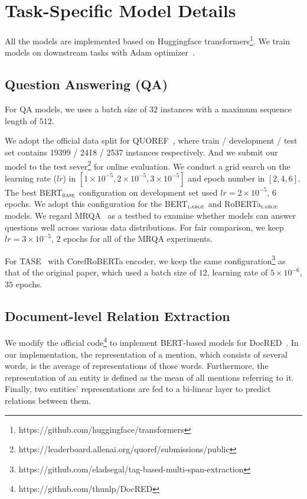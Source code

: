 \documentclass[11pt,a4paper]{article}
\newcommand\BASESIZE{$_{\small \textsc{base}}$\xspace}
\newcommand\LARGESIZE{$_{\small \textsc{large}}$\xspace}
\begin{document}
\section{Task-Specific Model Details}


All the models are implemented based on Huggingface transformers\footnote{https://github.com/huggingface/transformers}. We train models on downstream tasks with Adam optimizer~\citep{Adam}. 


\subsection{Question Answering (QA)}

For QA models, we uses a batch size of $32$ instances with a maximum sequence length of $512$. 

We adopt the official data split for QUOREF~\citep{QUOREF}, where train / development / test set contains 19399 / 2418 / 2537 instances respectively. And we submit our model to the test sever\footnote{https://leaderboard.allenai.org/quoref/submissions/public} for online evaluation.  We conduct a grid search on the learning rate ($lr$) in  $[1\times10^{-5}, 2\times10^{-5}, 3\times10^{-5}]$ and epoch number in $[2, 4, 6]$. The best BERT\BASESIZE configuration on development set used $lr=2\times10^{-5}$, $6$ epochs.  We adopt this configuration for the BERT\LARGESIZE and RoBERTa\LARGESIZE models. 
We regard MRQA~\citep{MRQA} as a testbed to examine whether models can answer questions well across various data distributions. For fair comparison, we keep $lr=3\times10^{-5}$, $2$ epochs for all of the MRQA experiments.

For TASE~\citep{TASE} with CorefRoBERTa encoder, we keep the same configuration\footnote{https://github.com/eladsegal/tag-based-multi-span-extraction} as that of the original paper, which used a batch size of $12$, learning rate of $5\times10^{-6}$, $35$ epochs. 



\subsection{Document-level Relation Extraction}

We modify the official code\footnote{https://github.com/thunlp/DocRED} to implement BERT-based models for DocRED~\citep{DocRED}. In our implementation, the representation of a mention, which consists of several words, is the average of  representations of those words. Furthermore, the representation of an entity is defined as the mean of all  mentions referring to it. Finally, two entities' representations are fed to a bi-linear layer to predict relations between them.
\end{document}
